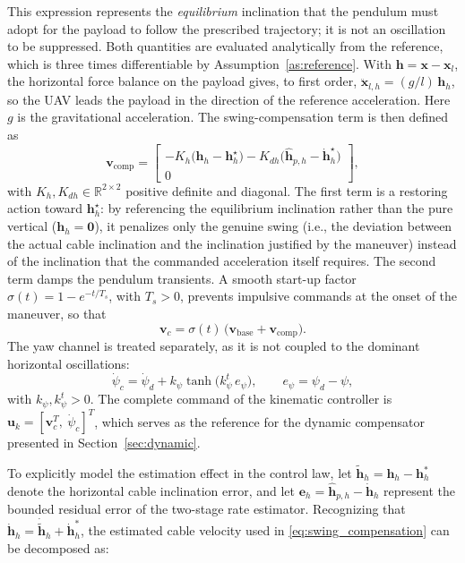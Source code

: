 \documentclass[sn-mathphys-num]{sn-jnl}
\theoremstyle{thmstyleone}%
\theoremstyle{thmstyletwo}%
\theoremstyle{thmstylethree}%
\begin{document}
This expression represents the \emph{equilibrium} inclination that the pendulum must adopt for the payload to follow the prescribed trajectory; it is not an oscillation to be suppressed. Both quantities are evaluated analytically from the reference, which is three times differentiable by Assumption~\ref{as:reference}. With $\mathbf{h}=\mathbf{x}-\mathbf{x}_l$, the horizontal force balance on the payload gives, to first order, $\ddot{\mathbf{x}}_{l,h}=(g/l)\,\mathbf{h}_h$, so the UAV leads the payload in the direction of the reference acceleration. Here $g$ is the gravitational acceleration. The swing-compensation term is then defined as \begin{equation}\label{eq:swing_compensation} \mathbf{v}_{\mathrm{comp}} = \begin{bmatrix} -K_h\big(\mathbf{h}_h-\mathbf{h}_h^\star\big) -K_{dh}\big(\hat{\mathbf{h}}_{p,h}-\dot{\mathbf{h}}_h^\star\big)\\[1mm] 0 \end{bmatrix}, \end{equation} with $K_h,K_{dh}\in\mathbb{R}^{2\times 2}$ positive definite and diagonal. The first term is a restoring action toward $\mathbf{h}_h^\star$: by referencing the equilibrium inclination rather than the pure vertical ($\mathbf{h}_h=\mathbf{0}$), it penalizes only the genuine swing (i.e., the deviation between the actual cable inclination and the inclination justified by the maneuver) instead of the inclination that the commanded acceleration itself requires. The second term damps the pendulum transients. A smooth start-up factor $\sigma(t)=1-e^{-t/T_s}$, with $T_s>0$, prevents impulsive commands at the onset of the maneuver, so that \begin{equation}\label{eq:final_reference} \mathbf{v}_c = \sigma(t)\,\big(\mathbf{v}_{\mathrm{base}} + \mathbf{v}_{\mathrm{comp}}\big). \end{equation} 
The yaw channel is treated separately, as it is not coupled to the dominant horizontal oscillations: 
\begin{equation}\label{eq:yaw_reference} \dot{\psi}_c = \dot{\psi}_d + k_{\psi}\tanh\!\big(k_{\psi}^t\,e_{\psi}\big), \qquad e_{\psi}=\psi_d-\psi, \end{equation} 
with $k_{\psi},k_{\psi}^t>0$. The complete command of the kinematic controller is $\mathbf{u}_k=[\mathbf{v}_c^T,\ \dot{\psi}_c]^T$, which serves as the reference for the dynamic compensator presented in Section~\ref{sec:dynamic}.

To explicitly model the estimation effect in the control law, let $\tilde{\mathbf{h}}_h = \mathbf{h}_h - \mathbf{h}_h^*$ denote the horizontal cable inclination error, and let $\mathbf{e}_h = \hat{\mathbf{h}}_{p,h} - \dot{\mathbf{h}}_h$ represent the bounded residual error of the two-stage rate estimator. Recognizing that $\dot{\mathbf{h}}_h = \dot{\tilde{\mathbf{h}}}_h + \dot{\mathbf{h}}_h^*$, the estimated cable velocity used in \eqref{eq:swing_compensation}  can be decomposed as:
\end{document}
